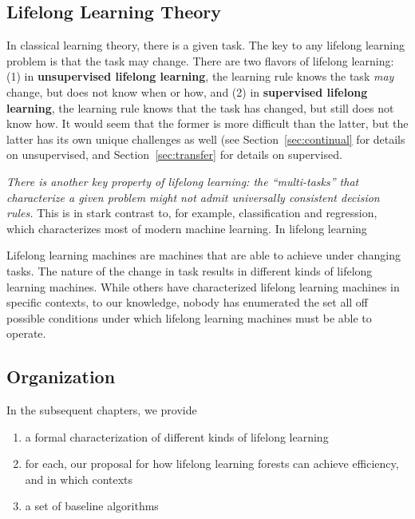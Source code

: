 \documentclass{article}
\begin{document}
\subsection{Lifelong Learning Theory}

In classical learning theory, there is a given task.  The key to any lifelong learning problem is that the task may change.  There are two flavors of lifelong learning: (1) in \textbf{unsupervised lifelong learning}, the learning rule knows the task \emph{may} change, but does not know when or how, and (2) in \textbf{supervised lifelong learning}, the learning rule knows that the task has changed, but still does not know how.  It would seem that the former is more difficult than the latter, but the latter has its own unique challenges as well (see Section~\ref{sec:continual} for details on unsupervised, and Section~\ref{sec:transfer} for details on supervised.  

\emph{There is another key property of lifelong learning: the ``multi-tasks'' that characterize a given problem might not admit universally consistent decision rules.}  This is in stark contrast to, for example, classification and regression, which characterizes most of modern machine learning.  In lifelong learning




Lifelong learning machines are machines that are able to achieve under changing tasks.  The nature of the change in task results in different kinds of lifelong learning machines. While others have characterized lifelong learning machines in specific contexts, to our knowledge, nobody has enumerated the set all off possible conditions under which lifelong learning machines must be able to operate. 


\subsection{Organization}

In the subsequent chapters, we provide 
\begin{enumerate}
    \item a formal characterization of different kinds of lifelong learning
    \item for each, our proposal for how lifelong learning forests can achieve efficiency, and in which contexts
    \item a set of baseline algorithms
\end{enumerate}
\end{document}
